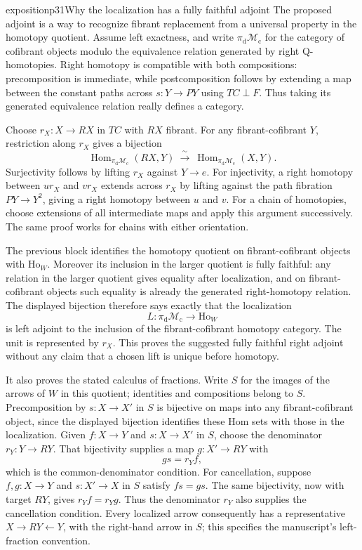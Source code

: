 \begin{dcomment}{exposition}{p31}{Why the localization has a fully faithful adjoint}
The proposed adjoint is a way to recognize fibrant replacement from a universal property in the homotopy quotient. Assume left exactness, and write $\pi_{\mathrm d}\mathcal M_{\mathrm c}$ for the category of cofibrant objects modulo the equivalence relation generated by right Q-homotopies. Right homotopy is compatible with both compositions: precomposition is immediate, while postcomposition follows by extending a map between the constant paths across $s:Y\to PY$ using $TC\perp F$. Thus taking its generated equivalence relation really defines a category.

Choose $r_X:X\to RX$ in $TC$ with $RX$ fibrant. For any fibrant-cofibrant $Y$, restriction along $r_X$ gives a bijection
\[
 \operatorname{Hom}_{\pi_{\mathrm d}\mathcal M_{\mathrm c}}(RX,Y)
 \ \xrightarrow{\ \sim\ }\
 \operatorname{Hom}_{\pi_{\mathrm d}\mathcal M_{\mathrm c}}(X,Y).
\]
Surjectivity follows by lifting $r_X$ against $Y\to e$. For injectivity, a right homotopy between $ur_X$ and $vr_X$ extends across $r_X$ by lifting against the path fibration $PY\to Y^2$, giving a right homotopy between $u$ and $v$. For a chain of homotopies, choose extensions of all intermediate maps and apply this argument successively. The same proof works for chains with either orientation.

The previous block identifies the homotopy quotient on fibrant-cofibrant objects with $\mathrm{Ho}_W$. Moreover its inclusion in the larger quotient is fully faithful: any relation in the larger quotient gives equality after localization, and on fibrant-cofibrant objects such equality is already the generated right-homotopy relation. The displayed bijection therefore says exactly that the localization
\[
 L:\pi_{\mathrm d}\mathcal M_{\mathrm c}\longrightarrow\mathrm{Ho}_W
\]
is left adjoint to the inclusion of the fibrant-cofibrant homotopy category. The unit is represented by $r_X$. This proves the suggested fully faithful right adjoint without any claim that a chosen lift is unique before homotopy.

It also proves the stated calculus of fractions. Write $S$ for the images of the arrows of $W$ in this quotient; identities and compositions belong to $S$. Precomposition by $s:X\to X'$ in $S$ is bijective on maps into any fibrant-cofibrant object, since the displayed bijection identifies these Hom sets with those in the localization. Given $f:X\to Y$ and $s:X\to X'$ in $S$, choose the denominator $r_Y:Y\to RY$. That bijectivity supplies a map $g:X'\to RY$ with
\[
 gs=r_Yf,
\]
which is the common-denominator condition. For cancellation, suppose $f,g:X\to Y$ and $s:X'\to X$ in $S$ satisfy $fs=gs$. The same bijectivity, now with target $RY$, gives $r_Yf=r_Yg$. Thus the denominator $r_Y$ also supplies the cancellation condition. Every localized arrow consequently has a representative $X\to RY\leftarrow Y$, with the right-hand arrow in $S$; this specifies the manuscript's left-fraction convention.


\end{dcomment}
